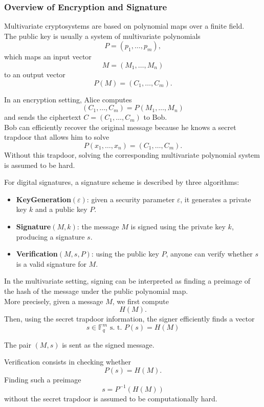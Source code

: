 \subsubsection{Overview of Encryption and Signature}
Multivariate cryptosystems are based on polynomial maps over a finite field.\\ 
The public key is usually a system of multivariate polynomials
\[
P=(p_1,\dots,p_m),
\]
which maps an input vector
\[
M=(M_1,\dots,M_n)
\]
to an output vector
\[
P(M)=(C_1,\dots,C_m).
\]

\noindent
In an encryption setting, Alice computes
\[
(C_1,\dots,C_m)=P(M_1,\dots,M_n)
\]
and sends the ciphertext \(C=(C_1,\dots,C_m)\) to Bob. \\
Bob can efficiently recover the original message because he knows a secret trapdoor that allows him to solve
\[
P(x_1,\dots,x_n)=(C_1,\dots,C_m).
\]
Without this trapdoor, solving the corresponding multivariate polynomial system is assumed to be hard.

\bigskip

\noindent
For digital signatures, a signature scheme is described by three algorithms:
\begin{itemize}
    \item \textbf{KeyGeneration}$(\varepsilon)$: given a security parameter \(\varepsilon\), it generates a private key \(k\) and a public key \(P\).
    \item \textbf{Signature}$(M,k)$: the message \(M\) is signed using the private key \(k\), producing a signature \(s\).
    \item \textbf{Verification}$(M,s,P)$: using the public key \(P\), anyone can verify whether \(s\) is a valid signature for \(M\).
\end{itemize}

\noindent
In the multivariate setting, signing can be interpreted as finding a preimage of the hash of the message under the public polynomial map. \\
More precisely, given a message \(M\), we first compute
\[
H(M).
\]
Then, using the secret trapdoor information, the signer efficiently finds a vector
\[
s \in \mathbb F_q^m \text{  s. t.  } P(s)=H(M)
\]

\noindent
The pair \((M,s)\) is sent as the signed message.
\medskip

\noindent
Verification consists in checking whether
\[
P(s)=H(M).
\]
Finding such a preimage
\[
s=P^{-1}(H(M))
\]
without the secret trapdoor is assumed to be computationally hard.